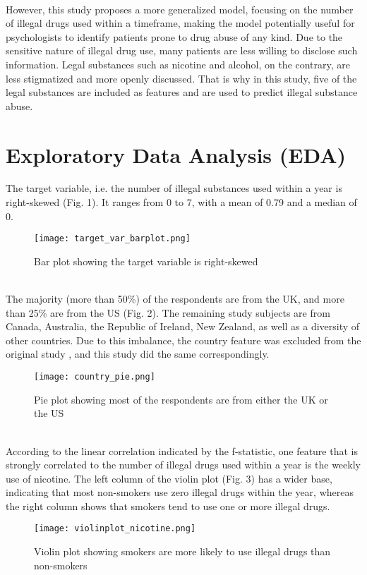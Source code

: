 \documentclass[12pt]{article}
\begin{document}
\\
However, this study proposes a more generalized model, focusing on the number of illegal drugs used within a timeframe, making the model potentially useful for psychologists to identify patients prone to drug abuse of any kind. Due to the sensitive nature of illegal drug use, many patients are less willing to disclose such information. Legal substances such as nicotine and alcohol, on the contrary, are less stigmatized and more openly discussed. That is why in this study, five of the legal substances are included as features and are used to predict illegal substance abuse.

\section{Exploratory Data Analysis (EDA)}
The target variable, i.e. the number of illegal substances used within a year is right-skewed (Fig. 1). It ranges from 0 to 7, with a mean of 0.79 and a median of 0.\\
\begin{figure}[!h]
\centering
\texttt{[image: target\_var\_barplot.png]}
\caption{Bar plot showing the target variable is right-skewed}
\end{figure}
\\
The majority (more than 50\%) of the respondents are from the UK, and more than 25\% are from the US (Fig. 2). The remaining study subjects are from Canada, Australia, the Republic of Ireland, New Zealand, as well as a diversity of other countries. Due to this imbalance, the country feature was excluded from the original study \cite{fehrman_muhammad_mirkes_egan_gorban_2017}, and this study did the same correspondingly.\\
\begin{figure}[!h]
\centering
\texttt{[image: country\_pie.png]}
\caption{Pie plot showing most of the respondents are from either the UK or the US}
\end{figure}
\\
According to the linear correlation indicated by the f-statistic, one feature that is strongly correlated to the number of illegal drugs used within a year is the weekly use of nicotine. The left column of the violin plot (Fig. 3) has a wider base, indicating that most non-smokers use zero illegal drugs within the year, whereas the right column shows that smokers tend to use one or more illegal drugs.\\
\begin{figure}[!h]
\centering
\texttt{[image: violinplot\_nicotine.png]}
\caption{Violin plot showing smokers are more likely to use illegal drugs than non-smokers}
\end{figure}
\end{document}
